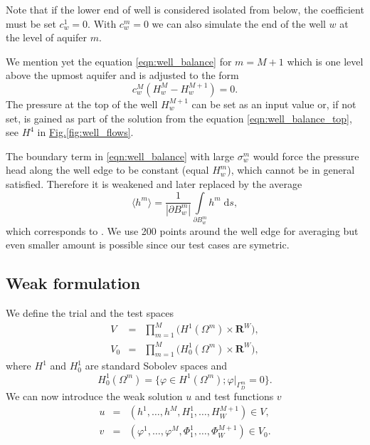 \documentclass[preprint,12pt]{elsarticle}
\newcommand{\fig}[1]{\hyperref[#1]{Fig.\ref{#1}}}
\def\abs#1{\left|#1\right|}
\def\avg#1{\langle#1\rangle}
\def\abs#1{| #1 |}
\newcommand{\dd}{\; \mathrm{d}}
\newcommand{\R}{\mathbf{R}}
\begin{document}
Note that if the lower end of well is considered isolated from below, the coefficient must be set $c^1_w = 0$.
With $c^m_w = 0$ we can also simulate the end of the well $w$ at the level of aquifer $m$.

We mention yet the equation \eqref{eqn:well_balance} for $m=M+1$ which is one level above the upmost aquifer
and is adjusted to the form
\begin{equation} \label{eqn:well_balance_top}
  c^M_w\left( H^{M}_w-H^{M+1}_w \right) = 0.
\end{equation}
The pressure at the top of the well $H^{M+1}_w$ can be set as an input value or, if not set, is gained 
as part of the solution from the equation \eqref{eqn:well_balance_top}, see $H^4$ in \fig{fig:well_flows}.

The boundary term in \eqref{eqn:well_balance} with large $\sigma^m_w$ would force the pressure head along the 
well edge to be constant (equal $H^m_w$), which cannot be in general satisfied. Therefore it is weakened and 
later replaced by the average
\begin{equation} \label{eqn:average}
  \avg{h^m} = \frac{1}{\abs{\partial B^m_w}} \int\limits_{\partial B^m_w} h^m \dd s,
\end{equation}
which corresponds to \cite{gracie}. We use 200 points around the well edge for averaging but even smaller 
amount is possible since our test cases are symetric.

\subsection{Weak formulation}
We define the trial and the test spaces
\begin{eqnarray} \label{eqn:spaces}
  V &=& \prod\limits_{m=1}^{M}\big(H^1(\Omega^m)\times\R^W\big), \\
  V_0 &=& \prod\limits_{m=1}^{M}\big(H^1_0(\Omega^m)\times\R^W\big),
\end{eqnarray}
where $H^1$ and $H^1_0$ are standard Sobolev spaces and 
\[ H^1_0(\Omega^m)=\{\varphi\in H^1(\Omega^m); \varphi|_{\Gamma^m_D}=0\}. \]
We can now introduce the weak solution $u$ and test functions $v$
\begin{eqnarray} \label{eqn:solution}
   u &=& (h^1,\ldots, h^M, H^1_1,\ldots,H^{M+1}_W)\in V, \\
   v &=& (\varphi^1,\ldots, \varphi^M, \Phi^1_1,\ldots,\Phi^{M+1}_W)\in V_0.
\end{eqnarray}
\end{document}
